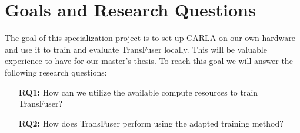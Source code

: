 \section{Goals and Research Questions}

The goal of this specialization project is to set up CARLA on our own hardware and use it to train and evaluate TransFuser locally. This will be valuable experience to have for our master's thesis. To reach this goal we will answer the following research questions:
\begin{itemize}

    \item[\textbf{RQ1:}] How can we utilize the available compute resources to train TransFuser?
    \item[\textbf{RQ2:}] How does TransFuser perform using the adapted training method?
\end{itemize}

\begin{comment}
gammelt:
\begin{itemize}    
    \item \textbf{RQ1:} Hva er state-of-the-art (i et simulert miljø / i CARLA)?
    \item \textbf{RQ2:} Kan vi gjenskape state-of-the-art i CARLA?
    \item \textbf{RQ?:} Hvordan sette opp CARLA i IDUN(?)
    \item \textbf{RQ?:} Can we evaluate the TransFuser model using their pre-trained weights?
    \item \textbf{RQ?:} Can we evaluate the TransFuser model using our re-trained weights?
\end{itemize}    
\end{comment}
